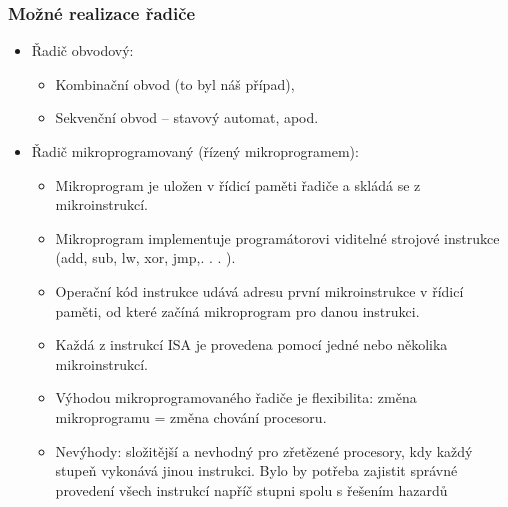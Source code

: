 \begin{frame}
\frametitle{Možné realizace řadiče}
\begin{itemize}
\item Řadič obvodový:
\begin{itemize}
\item Kombinační obvod (to byl náš případ),
\item Sekvenční obvod – stavový automat, apod.
\end{itemize}
\item Řadič mikroprogramovaný (řízený mikroprogramem):
\begin{itemize}
\item Mikroprogram je uložen v řídicí paměti řadiče a skládá se z mikroinstrukcí.
\item Mikroprogram implementuje programátorovi viditelné strojové instrukce (add, sub, lw, xor, jmp,. . . ).
\item Operační kód instrukce udává adresu první mikroinstrukce v řídicí paměti, od které začíná mikroprogram pro danou instrukci.
\item Každá z instrukcí ISA je provedena pomocí jedné nebo několika mikroinstrukcí.
\item Výhodou mikroprogramovaného řadiče je flexibilita: změna mikroprogramu = změna chování procesoru.
\item Nevýhody: složitější a nevhodný pro zřetězené procesory, kdy každý stupeň vykonává jinou instrukci. Bylo by potřeba zajistit správné provedení všech instrukcí napříč stupni spolu s řešením hazardů
\end{itemize}
\end{itemize}
\end{frame}
